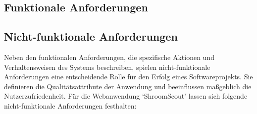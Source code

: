 \documentclass[../main.tex]{subfiles} %
\begin{document}
\subsection{Funktionale Anforderungen} %

\subsection{Nicht-funktionale Anforderungen} %

Neben den funktionalen Anforderungen, die spezifische Aktionen und Verhaltensweisen des Systems beschreiben, spielen
nicht-funktionale Anforderungen eine entscheidende Rolle für den Erfolg eines Softwareprojekts. Sie definieren die
Qualitätsattribute der Anwendung und beeinflussen maßgeblich die Nutzerzufriedenheit. Für die Webanwendung `ShroomScout'
lassen sich folgende nicht-funktionale Anforderungen festhalten:
\end{document}
